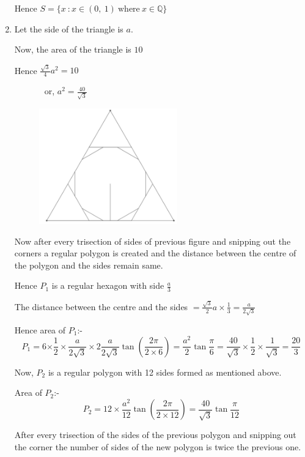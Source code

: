 \documentclass{article}
\begin{document}
\begin{enumerate}
Hence $S=\{ x \ : x\in (0, \ 1)\ \text{where}\ x\in \mathbb{Q}\}$
\bigskip

\bigskip

\bigskip

\bigskip

\bigskip


\item Let the side of the triangle is $a$.

Now, the area of the triangle is $10$

Hence $\displaystyle{\frac {\sqrt3}{4}}a^2=10$

\ \ \ \ \ \ \ or, $a^2=\displaystyle{\frac{40}{\sqrt3}}$

\begin{figure}[h]
  \centering
\includegraphics[width=6cm, height=5cm]{images/b.jpg}
\end{figure}

Now after every trisection of sides of previous figure and snipping out the corners a regular polygon is created and the distance between the centre of the polygon and the sides remain same.

Hence $P_1$ is a regular hexagon with side $\displaystyle{\frac{a}{3}}$

The distance between the centre and the sides $= \displaystyle{\frac{\sqrt 3}{2}a\times \frac{1}{3}=\frac{a}{2\sqrt3}}$

Hence area of $P_1$:-
$$P_1=6\displaystyle{\times \frac{1}{2}\times  \frac{a}{2\sqrt3} \times 2\frac{a}{2\sqrt3}  \tan \left(\frac{2 \pi}{2\times 6} \right)}= \frac{a^2}{2}\tan \frac{\pi}{6}=\frac{40}{\sqrt3}\times \frac{1}{2}\times \frac{1}{\sqrt3}=\frac{20}{3}$$

Now, $P_2$ is a regular polygon with 12 sides formed as mentioned above.

Area of $P_2$:-
$$P_2 = 12\times \frac{a^2}{12}\tan \left(\frac{2 \pi}{2\times 12} \right)=\frac{40}{\sqrt{3}}\tan \frac{\pi}{12} $$

After every trisection of the sides of the previous polygon and snipping out the corner the number of sides of the new polygon is twice the previous one.


\end{enumerate}
\end{document}

